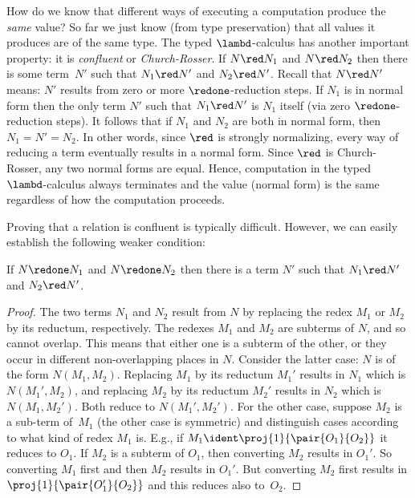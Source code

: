 \documentclass[../../../include/open-logic-section]{subfiles}
\begin{document}
How do we know that different ways of executing a computation produce
the \emph{same} value? So far we just know (from type preservation)
that all values it produces are of the same type. The typed
$\lambd$-calculus has another important property: it is
\emph{confluent} or \emph{Church-Rosser}. If $N \red N_1$ and $N \red
N_2$ then there is some term~$N'$ such that $N_1 \red N'$ and $N_2 \red
N'$. Recall that $N \red N'$ means: $N'$ results from zero or more
$\redone$-reduction steps. If $N_1$ is in normal form then the only
term $N'$ such that $N_1 \red N'$ is $N_1$ itself (via zero
$\redone$-reduction steps). It follows that if $N_1$ and $N_2$ are
both in normal form, then $N_1 = N' = N_2$. In other words, since
$\red$ is strongly normalizing, every way of reducing a term
eventually results in a normal form. Since $\red$ is Church-Rosser,
any two normal forms are equal. Hence, computation in the typed
$\lambd$-calculus always terminates and the value (normal form) is the
same regardless of how the computation proceeds.

Proving that a relation is confluent is typically difficult. However,
we can easily establish the following weaker condition:

\begin{prop}
If $N \redone N_1$ and $N \redone N_2$ then there is a term $N'$ such
that $N_1 \red N'$ and $N_2 \red N'$.
\end{prop}

\begin{proof}
  The two terms $N_1$ and $N_2$ result from $N$ by replacing the redex
  $M_1$ or $M_2$ by its reductum, respectively. The redexes $M_1$ and
  $M_2$ are subterms of $N$, and so cannot overlap. This means that
  either one is a subterm of the other, or they occur in different
  non-overlapping places in $N$. Consider the latter case: $N$ is of
  the form $N(M_1,M_2)$. Replacing $M_1$ by its reductum $M_1'$
  results in $N_1$ which is $N(M_1',M_2)$, and replacing $M_2$ by its
  reductum $M_2'$ results in $N_2$ which is $N(M_1,M_2')$. Both reduce
  to $N(M_1',M_2')$. For the other case, suppose $M_2$ is a sub-term
  of~$M_1$ (the other case is symmetric) and distinguish cases
  according to what kind of redex $M_1$ is. E.g., if $M_1 \ident
  \proj{1}{\pair{O_1}{O_2}}$ it reduces to $O_1$. If $M_2$ is a
  subterm of $O_1$, then converting $M_2$ results in $O_1'$. So
  converting $M_1$ first and then $M_2$ results in $O_1'$. But
  converting $M_2$ first results in $\proj{1}{\pair{O_1'}{O_2}}$ and
  this reduces also to~$O_2$.
\end{proof}
\end{document}
